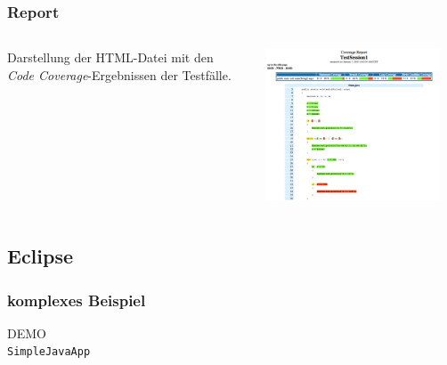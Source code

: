 \documentclass{beamer}
\begin{document}
  \begin{frame}\frametitle{Report}
    \begin{columns}
      \begin{column}{5cm}
        Darstellung der HTML-Datei mit den\\
        \textit{Code Coverage}-Ergebnissen der Testfälle.
        \vspace{1cm}
      \end{column}
      \begin{column}{5cm}
        \begin{overprint}
          \includegraphics[height=45mm]{pictures/demo_commandline/06_report_html.png}
        \end{overprint}
      \end{column}
    \end{columns}
  \end{frame}

  \subsection{Eclipse}
  \begin{frame}\frametitle{komplexes Beispiel}
    \centering
    \Huge{DEMO}\\
    \centering
    \normalsize{\texttt{SimpleJavaApp}}\\
  \end{frame}
\end{document}

